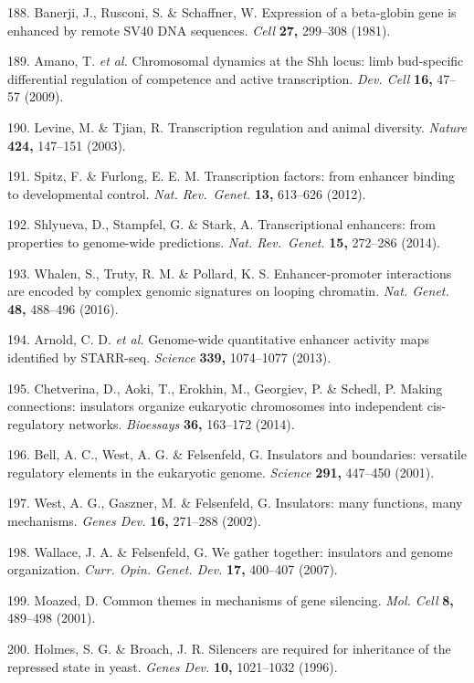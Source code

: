 \documentclass[11pt,twoside]{MPIthesis}
\theoremstyle{definition}
\theoremstyle{definition}
\theoremstyle{definition}
\theoremstyle{remark}
\begin{document}
188. Banerji, J., Rusconi, S. \& Schaffner, W. Expression of a
beta-globin gene is enhanced by remote SV40 DNA sequences. \emph{Cell}
\textbf{27,} 299--308 (1981).

189. Amano, T. \emph{et al.} Chromosomal dynamics at the Shh locus: limb
bud-specific differential regulation of competence and active
transcription. \emph{Dev. Cell} \textbf{16,} 47--57 (2009).

190. Levine, M. \& Tjian, R. Transcription regulation and animal
diversity. \emph{Nature} \textbf{424,} 147--151 (2003).

191. Spitz, F. \& Furlong, E. E. M. Transcription factors: from enhancer
binding to developmental control. \emph{Nat. Rev.~Genet.} \textbf{13,}
613--626 (2012).

192. Shlyueva, D., Stampfel, G. \& Stark, A. Transcriptional enhancers:
from properties to genome-wide predictions. \emph{Nat. Rev.~Genet.}
\textbf{15,} 272--286 (2014).

193. Whalen, S., Truty, R. M. \& Pollard, K. S. Enhancer-promoter
interactions are encoded by complex genomic signatures on looping
chromatin. \emph{Nat. Genet.} \textbf{48,} 488--496 (2016).

194. Arnold, C. D. \emph{et al.} Genome-wide quantitative enhancer
activity maps identified by STARR-seq. \emph{Science} \textbf{339,}
1074--1077 (2013).

195. Chetverina, D., Aoki, T., Erokhin, M., Georgiev, P. \& Schedl, P.
Making connections: insulators organize eukaryotic chromosomes into
independent cis-regulatory networks. \emph{Bioessays} \textbf{36,}
163--172 (2014).

196. Bell, A. C., West, A. G. \& Felsenfeld, G. Insulators and
boundaries: versatile regulatory elements in the eukaryotic genome.
\emph{Science} \textbf{291,} 447--450 (2001).

197. West, A. G., Gaszner, M. \& Felsenfeld, G. Insulators: many
functions, many mechanisms. \emph{Genes Dev.} \textbf{16,} 271--288
(2002).

198. Wallace, J. A. \& Felsenfeld, G. We gather together: insulators and
genome organization. \emph{Curr. Opin. Genet. Dev.} \textbf{17,}
400--407 (2007).

199. Moazed, D. Common themes in mechanisms of gene silencing.
\emph{Mol. Cell} \textbf{8,} 489--498 (2001).

200. Holmes, S. G. \& Broach, J. R. Silencers are required for
inheritance of the repressed state in yeast. \emph{Genes Dev.}
\textbf{10,} 1021--1032 (1996).
\end{document}
